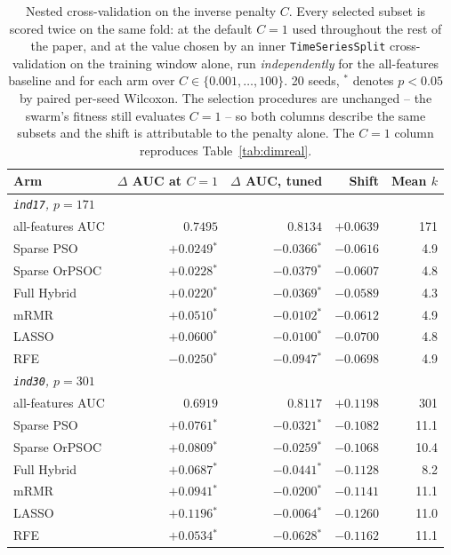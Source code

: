 \begin{table}[htbp]
    \centering
    \small\setlength{\tabcolsep}{5pt}
    \begin{tabular}{lrrrr}
    \hline
    Arm & $\Delta$ AUC at $C = 1$ & $\Delta$ AUC, tuned & Shift & Mean $k$ \\
    \hline
    \multicolumn{5}{l}{\textit{\texttt{ind17}, $p = 171$}} \\
    all-features AUC & $0.7495$ & $0.8134$ & $+0.0639$ & 171 \\
    Sparse PSO & $+0.0249$$^{*}$ & $-0.0366$$^{*}$ & $-0.0616$ & 4.9 \\
    Sparse OrPSOC & $+0.0228$$^{*}$ & $-0.0379$$^{*}$ & $-0.0607$ & 4.8 \\
    Full Hybrid & $+0.0220$$^{*}$ & $-0.0369$$^{*}$ & $-0.0589$ & 4.3 \\
    mRMR & $+0.0510$$^{*}$ & $-0.0102$$^{*}$ & $-0.0612$ & 4.9 \\
    LASSO & $+0.0600$$^{*}$ & $-0.0100$$^{*}$ & $-0.0700$ & 4.8 \\
    RFE & $-0.0250$$^{*}$ & $-0.0947$$^{*}$ & $-0.0698$ & 4.9 \\
    \hline
    \multicolumn{5}{l}{\textit{\texttt{ind30}, $p = 301$}} \\
    all-features AUC & $0.6919$ & $0.8117$ & $+0.1198$ & 301 \\
    Sparse PSO & $+0.0761$$^{*}$ & $-0.0321$$^{*}$ & $-0.1082$ & 11.1 \\
    Sparse OrPSOC & $+0.0809$$^{*}$ & $-0.0259$$^{*}$ & $-0.1068$ & 10.4 \\
    Full Hybrid & $+0.0687$$^{*}$ & $-0.0441$$^{*}$ & $-0.1128$ & 8.2 \\
    mRMR & $+0.0941$$^{*}$ & $-0.0200$$^{*}$ & $-0.1141$ & 11.1 \\
    LASSO & $+0.1196$$^{*}$ & $-0.0064$$^{*}$ & $-0.1260$ & 11.0 \\
    RFE & $+0.0534$$^{*}$ & $-0.0628$$^{*}$ & $-0.1162$ & 11.1 \\
    \hline
    \end{tabular}
    \caption{Nested cross-validation on the inverse penalty $C$. Every selected subset is scored twice on the same fold: at the default $C = 1$ used throughout the rest of the paper, and at the value chosen by an inner \texttt{TimeSeriesSplit} cross-validation on the training window alone, run \emph{independently} for the all-features baseline and for each arm over $C \in \{0.001, \ldots, 100\}$. 20 seeds, $^{*}$ denotes $p < 0.05$ by paired per-seed Wilcoxon. The selection procedures are unchanged -- the swarm's fitness still evaluates $C = 1$ -- so both columns describe the same subsets and the shift is attributable to the penalty alone. The $C = 1$ column reproduces Table~\ref{tab:dimreal}.}
    \label{tab:nestedcv}
\end{table}
